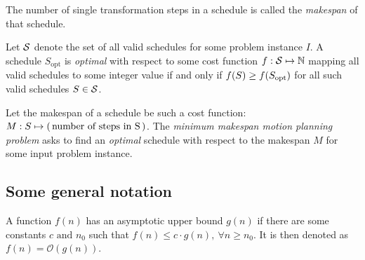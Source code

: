 \begin{definition}\label{def:makespan}
	The number of single transformation steps in a schedule is called the \emph{makespan} of that schedule.
\end{definition}

\begin{definition}\label{def:optimality}
	Let \(\mathcal{S}\) denote the set of all valid schedules for some problem instance \(I\). 
	A schedule \(S_\text{opt}\) is \emph{optimal} with respect to some cost function \(f : \mathcal{S} \mapsto \mathbb{N}\) mapping all valid schedules to some integer value if and only if \(f(S) \geq f(S_\text{opt})\) for all such valid schedules \(S \in \mathcal{S}\).
\end{definition}

\begin{definition}\label{def:m3pp}
	Let the makespan of a schedule be such a cost function: \(M : S \mapsto (\, \text{number of steps in S} \,)\). 
	The \emph{minimum makespan motion planning problem} asks to find an \emph{optimal} schedule with respect to the makespan \(M\) for some input problem instance.
\end{definition}

\subsection{Some general notation}

\begin{definition}
	A function \(f(n)\) has an asymptotic upper bound \(g(n)\) if there are some constants \(c \text{ and } n_0\) such that \(f(n) \leq c\cdot g(n),\ \forall n \geq n_0\). 
	It is then denoted as \(f(n) = \mathcal{O}(g(n))\). 
\end{definition}


